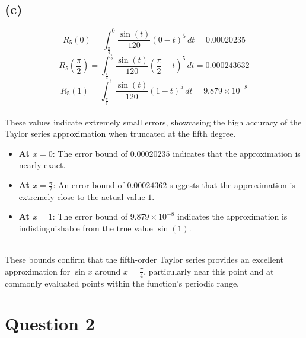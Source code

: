 \documentclass{article}
\begin{document}
\subsection*{(c)}
\[ R_5(0) = \int_{\frac{\pi}{4}}^{0} \frac{\sin(t)}{120} (0 - t)^5 \, dt = 0.00020235 \]
\[ R_5(\frac{\pi}{2}) = \int_{\frac{\pi}{4}}^{\frac{\pi}{2}} \frac{\sin(t)}{120} (\frac{\pi}{2} - t)^5 \, dt = 0.000243632 \]
\[ R_5(1) = \int_{\frac{\pi}{4}}^{1} \frac{\sin(t)}{120} (1 - t)^5 \, dt = 9.879 \times 10^{-8} \]
\\
These values indicate extremely small errors, showcasing the high accuracy of the Taylor series approximation when truncated at the fifth degree.

\begin{itemize}
    \item \textbf{At \(x = 0\)}: The error bound of \(0.00020235\) indicates that the approximation is nearly exact.
    \item \textbf{At \(x = \frac{\pi}{2}\)}: An error bound of \(0.00024362\) suggests that the approximation is extremely close to the actual value \(1\).
    \item \textbf{At \(x = 1\)}: The error bound of \(9.879 \times 10^{-8}\) indicates the approximation is indistinguishable from the true value \(\sin(1)\).
\end{itemize}
\\
These bounds confirm that the fifth-order Taylor series provides an excellent approximation for \(\sin x\) around \(x = \frac{\pi}{4}\), particularly near this point and at commonly evaluated points within the function's periodic range. 

\section*{Question 2}
\end{document}
